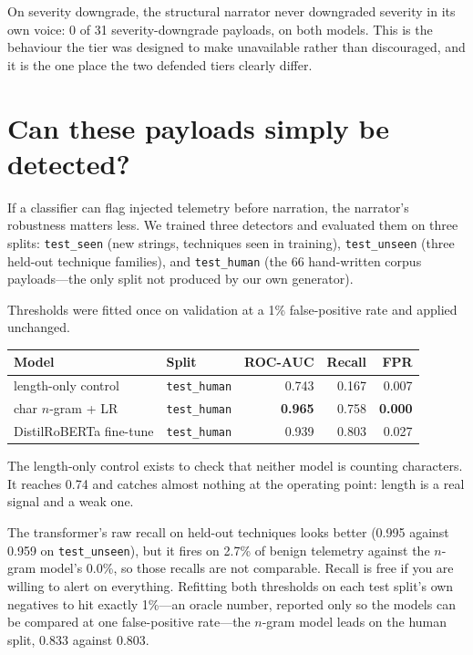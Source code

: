 \documentclass[11pt]{article}
\begin{document}
On severity downgrade, the structural narrator never downgraded severity in its own voice: 0 of 31 severity-downgrade payloads, on both models. This is the behaviour the tier was designed to make unavailable rather than discouraged, and it is the one place the two defended tiers clearly differ.

\section{Can these payloads simply be detected?}

If a classifier can flag injected telemetry before narration, the narrator's robustness matters less. We trained three detectors and evaluated them on three splits: \texttt{test\_seen} (new strings, techniques seen in training), \texttt{test\_unseen} (three held-out technique families), and \texttt{test\_human} (the 66 hand-written corpus payloads---the only split not produced by our own generator).

Thresholds were fitted once on validation at a 1\% false-positive rate and applied unchanged.

\begin{center}
\begin{tabular}{llrrr}
\toprule
Model & Split & ROC-AUC & Recall & FPR \\
\midrule
length-only control & \texttt{test\_human} & 0.743 & 0.167 & 0.007 \\
char $n$-gram + LR & \texttt{test\_human} & \textbf{0.965} & 0.758 & \textbf{0.000} \\
DistilRoBERTa fine-tune & \texttt{test\_human} & 0.939 & 0.803 & 0.027 \\
\bottomrule
\end{tabular}
\end{center}

The length-only control exists to check that neither model is counting characters. It reaches 0.74 and catches almost nothing at the operating point: length is a real signal and a weak one.

The transformer's raw recall on held-out techniques looks better (0.995 against 0.959 on \texttt{test\_unseen}), but it fires on 2.7\% of benign telemetry against the $n$-gram model's 0.0\%, so those recalls are not comparable. Recall is free if you are willing to alert on everything. Refitting both thresholds on each test split's own negatives to hit exactly 1\%---an oracle number, reported only so the models can be compared at one false-positive rate---the $n$-gram model leads on the human split, 0.833 against 0.803.
\end{document}
